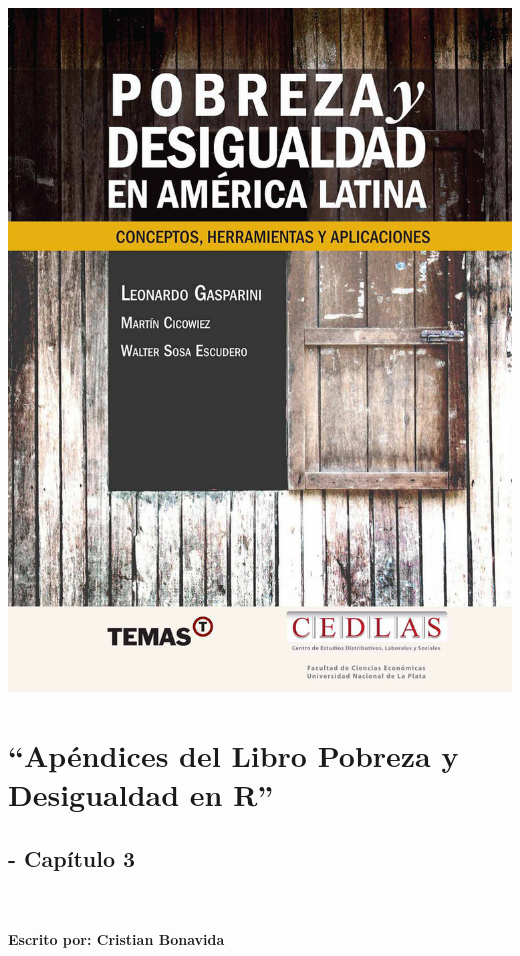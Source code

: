 \documentclass[
]{book}
\begin{document}
\begin{center}\includegraphics[width=0.8\linewidth]{portada_libro} \end{center}

\hypertarget{apuxe9ndices-del-libro-pobreza-y-desigualdad-en-r}{%
\chapter{``Apéndices del Libro Pobreza y Desigualdad en R''}\label{apuxe9ndices-del-libro-pobreza-y-desigualdad-en-r}}

\hypertarget{capuxedtulo-3}{%
\section{- Capítulo 3}\label{capuxedtulo-3}}

~

\hypertarget{escrito-por-cristian-bonavida}{%
\subsubsection*{Escrito por: Cristian Bonavida}\label{escrito-por-cristian-bonavida}}
\end{document}
